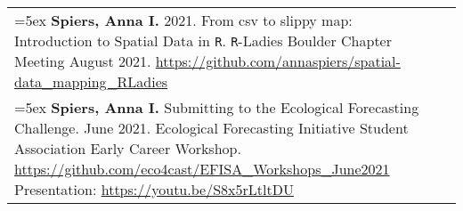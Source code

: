 \begin{longtable}{@{} >{\raggedright}p{6.10in} >{\raggedleft}X @{}}

\hangindent=5ex \textbf{Spiers, Anna I.} 2021. From csv to slippy map: Introduction to Spatial Data in \texttt{R}. \texttt{R}-Ladies Boulder Chapter Meeting August 2021. \url{https://github.com/annaspiers/spatial-data_mapping_RLadies} \tabularnewline

\hangindent=5ex \textbf{Spiers, Anna I.} Submitting to the Ecological Forecasting Challenge. June 2021. Ecological Forecasting Initiative Student Association Early Career Workshop. \url{https://github.com/eco4cast/EFISA_Workshops_June2021} \newline Presentation: \url{https://youtu.be/S8x5rLtltDU} \tabularnewline

\end{longtable}
